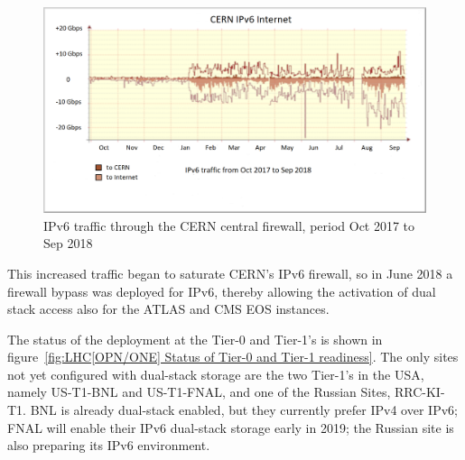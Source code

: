  \begin{figure}[h!]
\includegraphics[width=13cm]{figure1-revised.png}
\caption{IPv6 traffic through the CERN central firewall, period Oct 2017 to Sep 2018}
\label{fig:tier0-traffic}
\end{figure}
 
This increased traffic began to saturate CERN's IPv6 firewall, so in June 2018 a
firewall bypass was deployed for IPv6,
thereby allowing the activation of dual stack access also for the ATLAS and CMS EOS instances.    
 


The status of the deployment at the Tier-0 and Tier-1's is shown in figure~\ref{fig:LHC[OPN/ONE] Status of Tier-0 and Tier-1 readiness}.
The only sites not yet configured with dual-stack storage are the two Tier-1's in the USA, namely US-T1-BNL and US-T1-FNAL, and one of the Russian Sites, RRC-KI-T1. 
BNL is already dual-stack enabled, but they currently prefer IPv4 over IPv6; 
FNAL will enable their IPv6 dual-stack storage early in 2019; the Russian site is also preparing its IPv6 environment.

